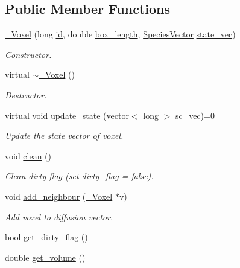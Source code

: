 \subsection*{Public Member Functions}
\begin{DoxyCompactItemize}
\item 
\hyperlink{classnw_1_1___voxel_a0622dd383528f5115c6a450b6cbb1b34}{\+\_\+\+Voxel} (long \hyperlink{classnw_1_1___voxel_a01b73aff9af26230df4c483c5bd81896}{id}, double \hyperlink{classnw_1_1___voxel_ad9c3dbd0ea989af6ba7e1b5e09f6a989}{box\+\_\+length}, \hyperlink{namespacenw_a68aa8285591d78ebfc793c531bd43a23}{Species\+Vector} \hyperlink{classnw_1_1___voxel_a7762f59802c2a0b54bd18acbf803ff34}{state\+\_\+vec})
\begin{DoxyCompactList}\small\item\em Constructor. \end{DoxyCompactList}\item 
virtual \hyperlink{classnw_1_1___voxel_ac179b9c8ef72a7bef8ba54a89fcfa4a9}{$\sim$\+\_\+\+Voxel} ()
\begin{DoxyCompactList}\small\item\em Destructor. \end{DoxyCompactList}\item 
virtual void \hyperlink{classnw_1_1___voxel_a5842ac3c24bda907204852db0cf46810}{update\+\_\+state} (vector$<$ long $>$ sc\+\_\+vec)=0
\begin{DoxyCompactList}\small\item\em Update the state vector of voxel. \end{DoxyCompactList}\item 
void \hyperlink{classnw_1_1___voxel_a09cd07ce7f9099eed8820e5c5f2b3977}{clean} ()
\begin{DoxyCompactList}\small\item\em Clean dirty flag (set dirty\+\_\+flag = false). \end{DoxyCompactList}\item 
void \hyperlink{classnw_1_1___voxel_a86f184c141fa863b796e9248222be7e9}{add\+\_\+neighbour} (\hyperlink{classnw_1_1___voxel}{\+\_\+\+Voxel} $\ast$v)
\begin{DoxyCompactList}\small\item\em Add voxel to diffusion vector. \end{DoxyCompactList}\item 
bool \hyperlink{classnw_1_1___voxel_aff78d5b2069500df3116fbc0b4c767a0}{get\+\_\+dirty\+\_\+flag} ()
\item 
double \hyperlink{classnw_1_1___voxel_a6c420e07f31de22e981f933a36a57b22}{get\+\_\+volume} ()

\end{DoxyCompactItemize}

